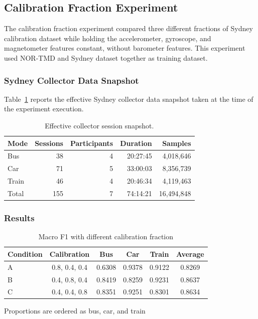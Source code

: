 \subsection{Calibration Fraction Experiment}

The calibration fraction experiment compared three different fractions of Sydney calibration dataset while holding the accelerometer, gyroscope, and
magnetometer features constant, without barometer features. This experiment used NOR-TMD and Sydney dataset together as training dataset.

\subsubsection{Sydney Collector Data Snapshot}

Table~\ref{tab:aws-run-c11f9a1a-effective-collector-snapshot} reports the effective Sydney collector data snapshot taken at the time of the experiment execution.

\begin{table}[htbp]
\centering
\caption{Effective collector session snapshot.}
\label{tab:aws-run-c11f9a1a-effective-collector-snapshot}
\begin{tabular}{lrrrr}
\hline
\textbf{Mode} & \textbf{Sessions} & \textbf{Participants} & \textbf{Duration} & \textbf{Samples} \\
\hline
Bus & 38 & 4 & 20:27:45 & 4,018,646 \\
Car & 71 & 5 & 33:00:03 & 8,356,739 \\
Train & 46 & 4 & 20:46:34 & 4,119,463 \\
Total & 155 & 7 & 74:14:21 & 16,494,848 \\
\hline
\end{tabular}
\end{table}

\subsubsection{Results}

\begin{table}[htbp]
\centering
\caption{Macro F1 with different calibration fraction}
\label{tab:transport-class-calibration-macro-f1}
\begin{threeparttable}
\small
\begin{tabular}{|l|c|ccc|c|}
\hline
\textbf{Condition} & \textbf{Calibration\tnote{1}} & \textbf{Bus} & \textbf{Car} & \textbf{Train} & \textbf{Average} \\
\hline
A & 0.8, 0.4, 0.4 & 0.6308 & 0.9378 & 0.9122 & 0.8269 \\
B & 0.4, 0.8, 0.4 & 0.8419 & 0.8259 & 0.9231 & 0.8637 \\
C & 0.4, 0.4, 0.8 & 0.8351 & 0.9251 & 0.8301 & 0.8634 \\
\hline
\end{tabular}
\begin{tablenotes}
\item[1] Proportions are ordered as bus, car, and train
\end{tablenotes}
\end{threeparttable}
\end{table}

